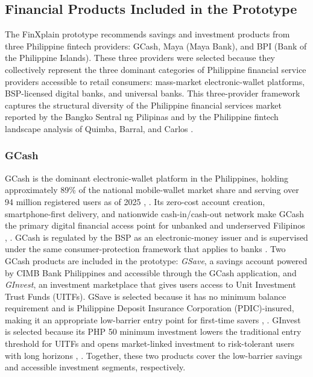 \documentclass{icsthesis}
\begin{document}
\begin{mainmatter}
			\subsection{Financial Products Included in the Prototype}
				The FinXplain prototype recommends savings and investment products from three Philippine fintech providers: GCash, Maya (Maya Bank), and BPI (Bank of the Philippine Islands). These three providers were selected because they collectively represent the three dominant categories of Philippine financial service providers accessible to retail consumers: mass-market electronic-wallet platforms, BSP-licensed digital banks, and universal banks. This three-provider framework captures the structural diversity of the Philippine financial services market reported by the Bangko Sentral ng Pilipinas \cite{ref35} and by the Philippine fintech landscape analysis of Quimba, Barral, and Carlos \cite{ref9}.

				\subsubsection{GCash}
					GCash is the dominant electronic-wallet platform in the Philippines, holding approximately 89\% of the national mobile-wallet market share and serving over 94 million registered users as of 2025 \cite{ref9}, \cite{ref35}. Its zero-cost account creation, smartphone-first delivery, and nationwide cash-in/cash-out network make GCash the primary digital financial access point for unbanked and underserved Filipinos \cite{ref35}, \cite{ref9}. GCash is regulated by the BSP as an electronic-money issuer and is supervised under the same consumer-protection framework that applies to banks \cite{ref35}. Two GCash products are included in the prototype: \emph{GSave}, a savings account powered by CIMB Bank Philippines and accessible through the GCash application, and \emph{GInvest}, an investment marketplace that gives users access to Unit Investment Trust Funds (UITFs). GSave is selected because it has no minimum balance requirement and is Philippine Deposit Insurance Corporation (PDIC)-insured, making it an appropriate low-barrier entry point for first-time savers \cite{ref35}, \cite{ref66}. GInvest is selected because its PHP 50 minimum investment lowers the traditional entry threshold for UITFs and opens market-linked investment to risk-tolerant users with long horizons \cite{ref9}, \cite{ref66}. Together, these two products cover the low-barrier savings and accessible investment segments, respectively.


\end{mainmatter}
\end{document}
